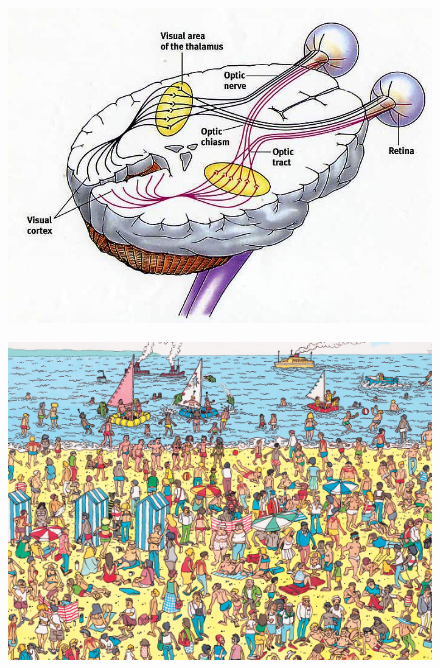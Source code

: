 \documentclass[10pt]{beamer}
\begin{document}


\begin{frame}{}
    \begin{figure}
        \centering
        \includegraphics[width=0.9\linewidth]{./img/visual_system_brain.jpg}
    \end{figure}
\end{frame}

\begin{frame}{}
    \begin{figure}
        \centering
        \includegraphics[width=0.9\linewidth]{./img/wheres_wally.jpg}
    \end{figure}
\end{frame}
\end{document}
